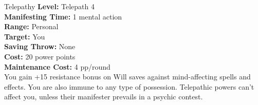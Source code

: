 {Telepathy}
{
	\textbf{Level:}
	Telepath 4\\
	\textbf{Manifesting Time:}
	1 mental action\\
	\textbf{Range:}
	Personal\\
	\textbf{Target:}
	You\\
	\textbf{Saving Throw:}
	None\\
	\textbf{Cost:}
	20 power points\\
	\textbf{Maintenance Cost:}
	4 pp/round\\
}
{
	You gain +15 resistance bonus on Will saves against mind-affecting spells and effects. You are also immune to any type of possession. Telepathic powers can't affect you, unless their manifester prevails in a psychic contest.
}
